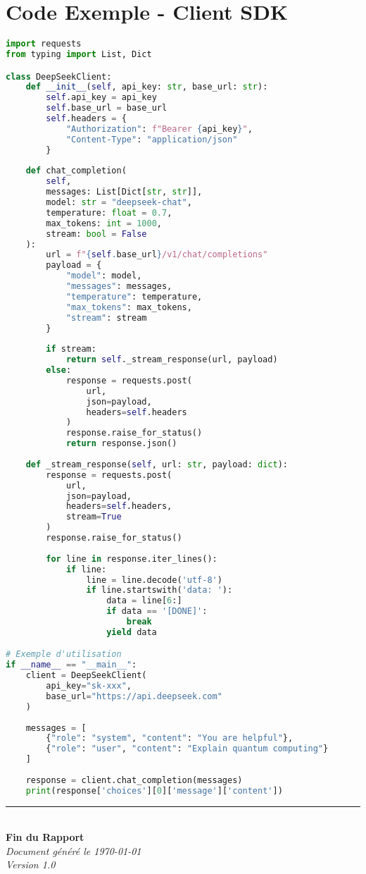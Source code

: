 \documentclass[12pt,a4paper]{article}
\begin{document}
\section{Code Exemple - Client SDK}

\begin{lstlisting}[language=python, caption=deepseek\_client.py]
import requests
from typing import List, Dict

class DeepSeekClient:
    def __init__(self, api_key: str, base_url: str):
        self.api_key = api_key
        self.base_url = base_url
        self.headers = {
            "Authorization": f"Bearer {api_key}",
            "Content-Type": "application/json"
        }
    
    def chat_completion(
        self, 
        messages: List[Dict[str, str]],
        model: str = "deepseek-chat",
        temperature: float = 0.7,
        max_tokens: int = 1000,
        stream: bool = False
    ):
        url = f"{self.base_url}/v1/chat/completions"
        payload = {
            "model": model,
            "messages": messages,
            "temperature": temperature,
            "max_tokens": max_tokens,
            "stream": stream
        }
        
        if stream:
            return self._stream_response(url, payload)
        else:
            response = requests.post(
                url, 
                json=payload, 
                headers=self.headers
            )
            response.raise_for_status()
            return response.json()
    
    def _stream_response(self, url: str, payload: dict):
        response = requests.post(
            url,
            json=payload,
            headers=self.headers,
            stream=True
        )
        response.raise_for_status()
        
        for line in response.iter_lines():
            if line:
                line = line.decode('utf-8')
                if line.startswith('data: '):
                    data = line[6:]
                    if data == '[DONE]':
                        break
                    yield data

# Exemple d'utilisation
if __name__ == "__main__":
    client = DeepSeekClient(
        api_key="sk-xxx",
        base_url="https://api.deepseek.com"
    )
    
    messages = [
        {"role": "system", "content": "You are helpful"},
        {"role": "user", "content": "Explain quantum computing"}
    ]
    
    response = client.chat_completion(messages)
    print(response['choices'][0]['message']['content'])
\end{lstlisting}

\vfill

\begin{center}
\rule{0.8\textwidth}{0.4pt}\\[0.3cm]
{\large\textbf{Fin du Rapport}}\\[0.2cm]
\textit{Document généré le \today}\\
\textit{Version 1.0}
\end{center}
\end{document}
